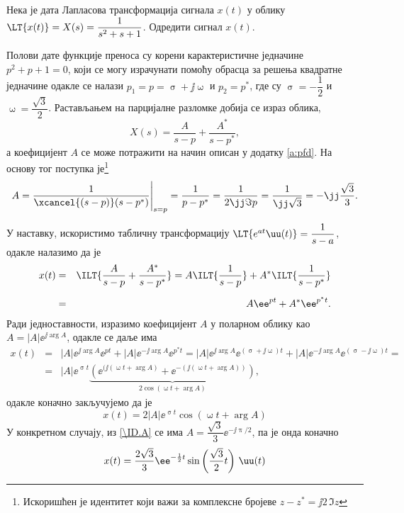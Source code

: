 \PID \label{z:damp_sin}
Нека је дата Лапласова трансформација сигнала $x(t)$ у облику $\LT{x(t)} = X(s) = \dfrac{1}{s^2 + s + 1}$. Одредити 
сигнал $x(t)$. 

\RESENJE  Полови дате функције преноса су корени карактеристичне једначине 
$p^2 + p + 1 = 0$, који се могу израчунати помоћу обрасца за решења квадратне једначине одакле се налази
$p_{1} = p = \upsigma + \jj\upomega$ и $p_2 = p^\ast$, где су $\upsigma = -\dfrac12$ и $ \upomega = \dfrac{\sqrt{3}}{2}$. 
Растављањем на парцијалне разломке добија се израз облика,
\begin{equation}
    X(s) = \dfrac{A}{s - p} + \dfrac{A^\ast}{s - p^\ast},
\end{equation}
а коефицијент $A$ се може потражити на начин описан у додатку \ref{a:pfd}. На основу тог поступка 
је\footnote{Искоришћен је идентитет који важи за комплексне бројеве 
$z - z^\ast = \jj 2 \, \Im{z}$} 
\begin{equation}
    A = \dfrac{1}{\xcancel{(s - p)}(s - p^\ast)} \Bigg|_{s = p} 
      = \dfrac{1}{p - p^\ast} = \dfrac{1}{2 \jj \Im{p} } = \dfrac{1}{\jj\sqrt{3}} = -\jj \dfrac{\sqrt{3}}{3}. \label{\ID.A}
\end{equation}

У наставку, искористимо табличну трансформацију $\LT{e^{at}\uu(t)} = \dfrac{1}{s - a}$, одакле налазимо да је 
\begin{eqnarray}
x(t) &=& \ILT{ \dfrac{A}{s - p} + \dfrac{A^\ast}{s - p^\ast} } = 
       A \ILT{ \dfrac{1}{s - p}} + A^\ast \ILT{ \dfrac{1}{s - p^{\ast}}}  \\[2mm]
     &=&
     A \ee^{pt} + A^* \ee^{p^\ast t}.
\end{eqnarray}
Ради једноставности, изразимо коефицијент $A$ у поларном облику као $A = |A| \ee^{\jj\arg{A}}$, одакле се даље има
\begin{eqnarray}
    x(t) &=&
    |A| \ee^{\jj \arg{A}} \ee^{pt} + |A| \ee^{-\jj \arg{A}} \ee^{p^\ast t} = 
    |A| \ee^{\jj \arg{A}} \ee^{(\upsigma + \jj\upomega)t} + |A| \ee^{-\jj \arg{A}} \ee^{(\upsigma - \jj\upomega) t} = \\
    &=&
    |A| \ee^{\upsigma t} 
    \underbrace{
    \left( 
        \ee^{(\jj(\upomega t + \arg A) } + \ee^{ -(\jj(\upomega t + \arg A)) } 
    \right)}_{ 2\cos(\upomega t + \arg A) },
\end{eqnarray}
одакле коначно закључујемо да је 
\begin{equation}
    x(t) = 2|A| \ee^{\upsigma t} \cos(\upomega t + \arg A)
\end{equation}
У конкретном случају, из \eqref{\ID.A} се има $A = \dfrac{\sqrt 3}{3} \ee^{-\jj\uppi/2}$, па је онда коначно
\begin{equation}
    x(t) = \dfrac{2\sqrt 3}{3} \ee^{-\frac{1}{2}t} \sin \left(\dfrac{\sqrt 3}{2} t\right) \, \uu(t)
\end{equation}